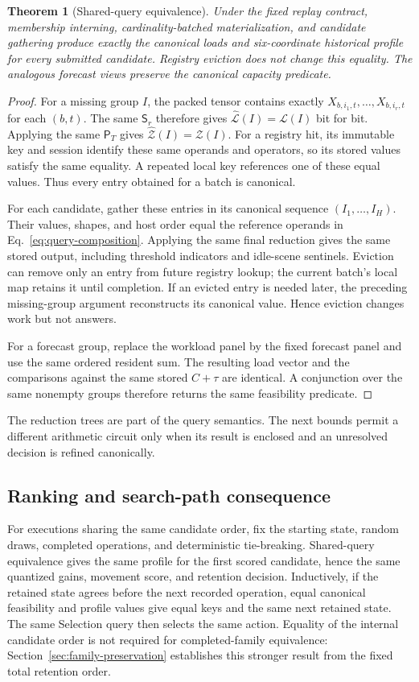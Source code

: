 \documentclass[11pt]{article}
\newtheorem{theorem}{Theorem}
\begin{document}
\begin{theorem}[Shared-query equivalence]
Under the fixed replay contract, membership interning, cardinality-batched materialization, and candidate gathering produce exactly the canonical loads and six-coordinate historical profile for every submitted candidate. Registry eviction does not change this equality. The analogous forecast views preserve the canonical capacity predicate.
\end{theorem}
\begin{proof}
For a missing group $I$, the packed tensor contains exactly $X_{b,i_1,t},\ldots,X_{b,i_r,t}$ for each $(b,t)$. The same $\mathsf S_r$ therefore gives $\widehat{\mathcal L}(I)=\mathcal L(I)$ bit for bit. Applying the same $\mathsf P_T$ gives $\widehat{\mathcal Z}(I)=\mathcal Z(I)$. For a registry hit, its immutable key and session identify these same operands and operators, so its stored values satisfy the same equality. A repeated local key references one of these equal values. Thus every entry obtained for a batch is canonical.

For each candidate, gather these entries in its canonical sequence $(I_1,\ldots,I_H)$. Their values, shapes, and host order equal the reference operands in Eq.~\eqref{eq:query-composition}. Applying the same final reduction gives the same stored output, including threshold indicators and idle-scene sentinels. Eviction can remove only an entry from future registry lookup; the current batch's local map retains it until completion. If an evicted entry is needed later, the preceding missing-group argument reconstructs its canonical value. Hence eviction changes work but not answers.

For a forecast group, replace the workload panel by the fixed forecast panel and use the same ordered resident sum. The resulting load vector and the comparisons against the same stored $C+\tau$ are identical. A conjunction over the same nonempty groups therefore returns the same feasibility predicate.
\end{proof}

The reduction trees are part of the query semantics. The next bounds permit a different arithmetic circuit only when its result is enclosed and an unresolved decision is refined canonically.

\subsection{Ranking and search-path consequence}
For executions sharing the same candidate order, fix the starting state, random draws, completed operations, and deterministic tie-breaking. Shared-query equivalence gives the same profile for the first scored candidate, hence the same quantized gains, movement score, and retention decision. Inductively, if the retained state agrees before the next recorded operation, equal canonical feasibility and profile values give equal keys and the same next retained state. The same Selection query then selects the same action. Equality of the internal candidate order is not required for completed-family equivalence: Section~\ref{sec:family-preservation} establishes this stronger result from the fixed total retention order.
\end{document}
